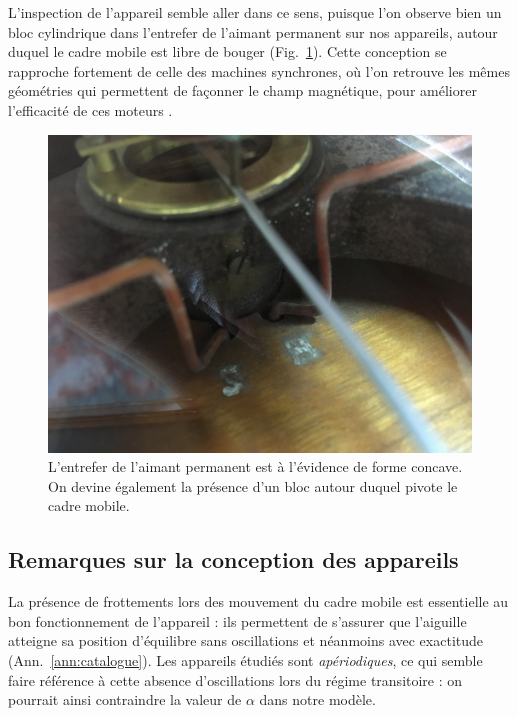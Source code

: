 \documentclass[12pt,a4paper,fleqn]{article}
\begin{document}
L'inspection de l'appareil semble aller dans ce sens, puisque l'on observe bien un bloc cylindrique dans l'entrefer de l'aimant permanent sur nos appareils, autour duquel le cadre mobile est libre de bouger (Fig.~\ref{fig:theproof}).
Cette conception se rapproche fortement de celle des machines synchrones, où l'on retrouve les mêmes géométries qui permettent de façonner le champ magnétique, pour améliorer l'efficacité de ces moteurs \cite{Cardini2017}.

\begin{figure}[htbp]
    \center
    \includegraphics[width=\linewidth, trim=0 0 0 1000, clip, angle=180]{images/IMG_4050.jpg}
    \caption{L'entrefer de l'aimant permanent est à l'évidence de forme concave.
    On devine également la présence d'un bloc autour duquel pivote le cadre mobile.}
    \label{fig:theproof}
\end{figure}

\subsection{Remarques sur la conception des appareils}

La présence de frottements lors des mouvement du cadre mobile est essentielle au bon fonctionnement de l'appareil : ils permettent de s'assurer que l'aiguille atteigne sa position d'équilibre \og sans oscillations et néanmoins avec exactitude \fg{} (Ann.~\ref{ann:catalogue}).
Les appareils étudiés sont \emph{apériodiques}, ce qui semble faire référence à cette absence d'oscillations lors du régime transitoire : on pourrait ainsi contraindre la valeur de $\alpha$ dans notre modèle.
\end{document}

